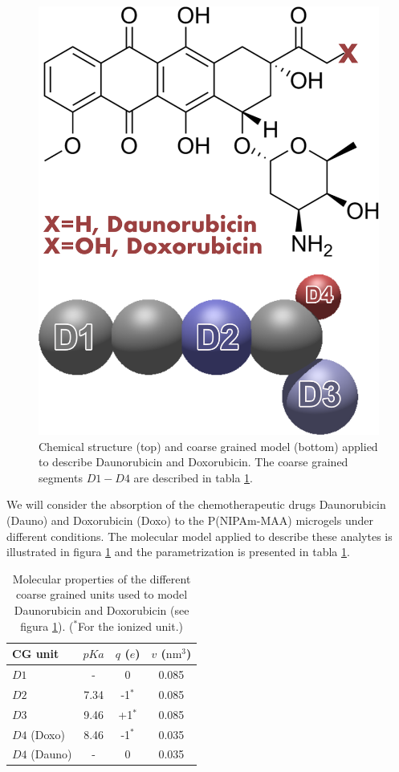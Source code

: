 \begin{figure}[!tb]
\centering
\includegraphics[width=0.35\linewidth]{Figures/graph-gel/dauno-doxo.png}
\caption{Chemical structure (top) and coarse grained model (bottom) applied to describe Daunorubicin and Doxorubicin.
The coarse grained segments $D1-D4$ are described in tabla \ref{table:drugs}.}
\label{fig:dauno-doxo}
\end{figure}



We will consider the absorption of the chemotherapeutic drugs Daunorubicin (Dauno) and Doxorubicin (Doxo) to the P(NIPAm-MAA) microgels under different conditions.
The molecular model applied to describe these analytes is illustrated in figura  \ref{fig:dauno-doxo} and the parametrization is presented in tabla \ref{table:drugs}.\addcite[PerezChavez2020]


\begin{table}
\small
\begin{tabular}{|lccc|}
    \hline
    {CG unit} & {$pKa$} & {$q$ ($e$)} & {$v$ ($\text{nm}^3$)} \\
      \hline
$D1$ & - & 0 & 0.085\\
$D2$ & 7.34 & -1$^\ast$ & 0.085\\
$D3$ & 9.46 & +1$^\ast$ & 0.085\\ 
$D4$ (Doxo) & 8.46 & -1$^\ast$ & 0.035\\
$D4$ (Dauno) & - & 0 & 0.035 \\
    \hline
  \end{tabular}
 \caption{Molecular properties of the different coarse grained units used to model Daunorubicin and Doxorubicin (see figura \ref{fig:dauno-doxo}).
\footnotesize ($^\ast$For the ionized unit.)}
\label{table:drugs} 
\end{table}



